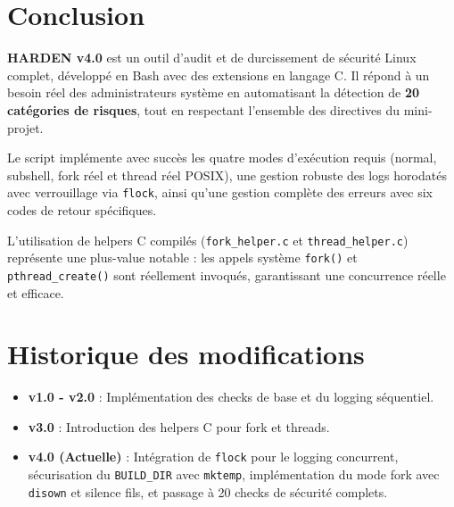 \documentclass[12pt,a4paper]{article}
\newcommand{\cmd}[1]{\texttt{\textcolor{codeText}{#1}}}
\newcommand{\fichier}[1]{\texttt{\textcolor{bleuENSET}{#1}}}
\begin{document}
\newpage

\section{Conclusion}

\textbf{HARDEN v4.0} est un outil d'audit et de durcissement de sécurité Linux complet, développé en Bash avec des extensions en langage C. Il répond à un besoin réel des administrateurs système en automatisant la détection de \textbf{20 catégories de risques}, tout en respectant l'ensemble des directives du mini-projet.

Le script implémente avec succès les quatre modes d'exécution requis (normal, subshell, fork réel et thread réel POSIX), une gestion robuste des logs horodatés avec verrouillage via \cmd{flock}, ainsi qu'une gestion complète des erreurs avec six codes de retour spécifiques.

L'utilisation de helpers C compilés (\fichier{fork\_helper.c} et \fichier{thread\_helper.c}) représente une plus-value notable : les appels système \cmd{fork()} et \cmd{pthread\_create()} sont réellement invoqués, garantissant une concurrence réelle et efficace.

\section*{Historique des modifications}
\begin{itemize}
    \item \textbf{v1.0 - v2.0} : Implémentation des checks de base et du logging séquentiel.
    \item \textbf{v3.0} : Introduction des helpers C pour fork et threads.
    \item \textbf{v4.0 (Actuelle)} : Intégration de \cmd{flock} pour le logging concurrent, sécurisation du \cmd{BUILD\_DIR} avec \cmd{mktemp}, implémentation du mode fork avec \cmd{disown} et silence fils, et passage à 20 checks de sécurité complets.
\end{itemize}

\vspace{1cm}
\end{document}
